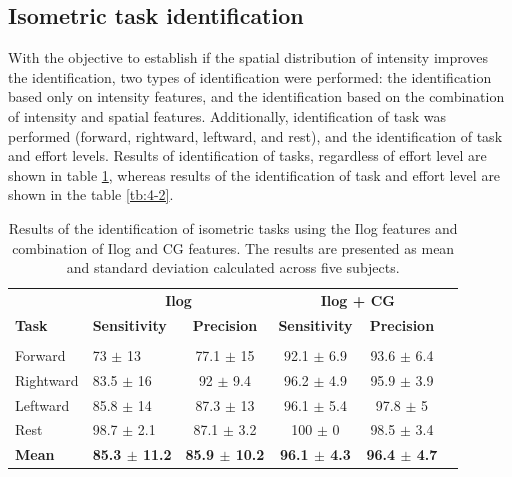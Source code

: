 \subsection{Isometric task identification}
With the objective to establish if the spatial distribution of intensity improves the identification, two types of identification were performed: the identification based only on intensity features, and the identification based on the combination of intensity and spatial features. Additionally, identification of task was performed (forward, rightward, leftward, and rest), and the identification of task and effort levels. Results of identification of tasks, regardless of effort level are shown in table \ref{tb:4-1}, whereas results of the identification of task and effort level are shown in the table \ref{tb:4-2}.

\begin{table}[]
\centering
\caption{Results of the identification of isometric tasks using the Ilog features and combination of Ilog and CG features. The results are presented as mean and standard deviation calculated across five subjects.}
\label{tb:4-1}
\begin{tabular}{llcccc}
 
              & \multicolumn{2}{c}{\textbf{Ilog}}                            & \multicolumn{2}{c}{\textbf{Ilog + CG}}                       \\
\textbf{Task} & \textbf{Sensitivity}     & \textbf{Precision}       & \textbf{Sensitivity}     & \textbf{Precision}       \\ \hline
                         &                                           &          &          &                   \\
Forward       & 73 $\pm$ 13              & 77.1 $\pm$ 15            & 92.1 $\pm$ 6.9           & 93.6 $\pm$ 6.4           \\
Rightward     & 83.5 $\pm$ 16            & 92 $\pm$ 9.4             & 96.2 $\pm$ 4.9           & 95.9 $\pm$ 3.9           \\
Leftward      & 85.8 $\pm$ 14            & 87.3 $\pm$ 13            & 96.1 $\pm$ 5.4           & 97.8 $\pm$ 5             \\
Rest          & 98.7 $\pm$ 2.1           & 87.1 $\pm$ 3.2           & 100 $\pm$ 0              & 98.5 $\pm$ 3.4           \\ 
\textbf{Mean} & \textbf{85.3 $\pm$ 11.2} & \textbf{85.9 $\pm$ 10.2} & \textbf{96.1 $\pm$  4.3} & \textbf{96.4  $\pm$ 4.7}
\end{tabular}
\end{table}

